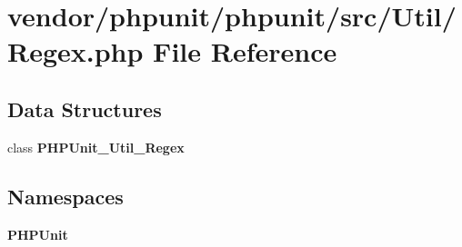 \section{vendor/phpunit/phpunit/src/\+Util/\+Regex.php File Reference}
\label{phpunit_2phpunit_2src_2_util_2_regex_8php}
\subsection*{Data Structures}
\begin{DoxyCompactItemize}
\item 
class {\bf P\+H\+P\+Unit\+\_\+\+Util\+\_\+\+Regex}
\end{DoxyCompactItemize}
\subsection*{Namespaces}
\begin{DoxyCompactItemize}
\item 
 {\bf P\+H\+P\+Unit}
\end{DoxyCompactItemize}
